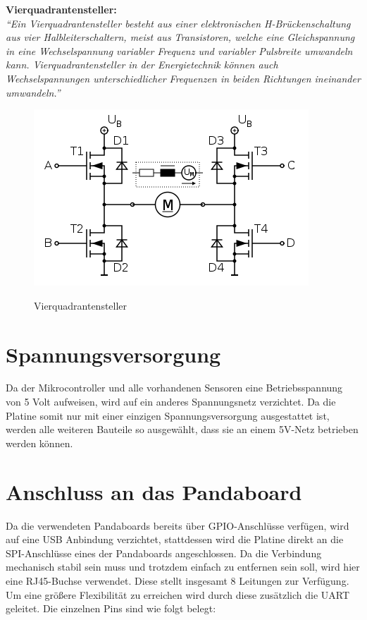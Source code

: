 \begin{minipage}{0.9\textwidth}
\textbf{Vierquadrantensteller:\\}
\emph{``Ein Vierquadrantensteller besteht aus einer elektronischen H-Brückenschaltung aus vier Halbleiterschaltern, meist aus Transistoren, 
welche eine Gleichspannung in eine Wechselspannung variabler Frequenz und variabler Pulsbreite umwandeln kann. Vierquadrantensteller 
in der Energietechnik können auch Wechselspannungen unterschiedlicher Frequenzen in beiden Richtungen ineinander umwandeln.''}\cite{vierquadrantensteller2}
\end{minipage}

\begin{figure}[H]
\centering
\includegraphics[width=.8\textwidth]{Vierquadrantensteller.png}\\
\caption{Vierquadrantensteller \cite{vierquadrantensteller}}%
\label{fig:Vierquadrantensteller2}
\end{figure}

\section{Spannungsversorgung}
Da der Mikrocontroller und alle vorhandenen Sensoren eine Betriebs\-spannung von 5 Volt aufweisen, wird auf ein anderes Spannungsnetz verzichtet.
Da die Platine somit nur mit einer einzigen Spannungsversorgung ausgestattet ist, werden alle weiteren Bauteile so ausgewählt, dass sie 
an einem 5V-Netz betrieben werden können.

\section{Anschluss an das Pandaboard}
Da die verwendeten Pandaboards bereits über GPIO-Anschlüsse verfügen, wird auf eine USB Anbindung verzichtet, stattdessen wird die Platine direkt an die SPI-Anschlüsse
eines der Pandaboards angeschlossen. Da die Verbindung mechanisch stabil sein muss und trotzdem einfach zu entfernen sein soll, wird hier eine RJ45-Buchse verwendet.
Diese stellt insgesamt 8 Leitungen zur Verfügung. Um eine größere Flexibilität zu erreichen wird durch diese zusätzlich die UART geleitet.
Die einzelnen Pins sind wie folgt belegt:

